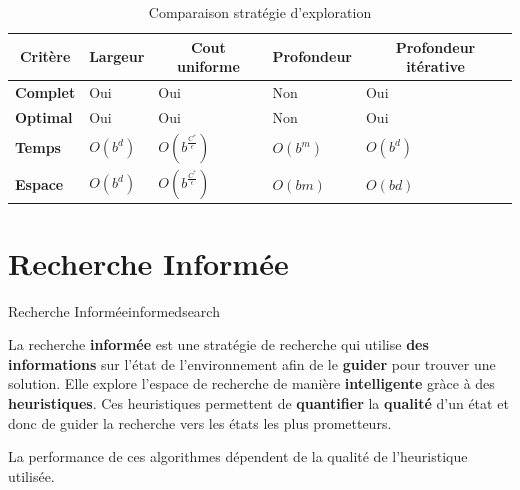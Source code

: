 \documentclass[a4paper, 12pt]{extarticle}
\begin{document}
\begin{table}[H]
    \caption{Comparaison stratégie d'exploration}\label{tab:searchcomp}
    \begin{center}
        \begin{tabular}[c]{|l||l|l|l|l|}
            \hline
            \multicolumn{1}{|c|}{\textbf{Critère}} & 
            \multicolumn{1}{|c|}{\textbf{Largeur}} &
            \multicolumn{1}{c|}{\textbf{Cout uniforme}} &
            \multicolumn{1}{c|}{\textbf{Profondeur}} &
            \multicolumn{1}{c|}{\textbf{Profondeur itérative}} \\

            \hline
            \textbf{Complet}& Oui & Oui & Non & Oui \\ 
            \hline
            \textbf{Optimal}& Oui & Oui & Non & Oui\\ 
            \hline
            \textbf{Temps}& $O(b^d)$ & $O(b^{\frac{C^*}{\epsilon}})$ & $O(b^m)$ & $O(b^d)$\\ 
            \hline
            \textbf{Espace}& $O(b^d)$ & $O(b^{\frac{C^*}{\epsilon}})$ & $O(bm)$ & $O(bd)$\\

            \hline
        \end{tabular}
    \end{center}
\end{table}


\newpage

\section{Recherche Informée} %
\label{sec:recherche_informee} 

\begin{definition}{Recherche Informée}{informedsearch}

    La recherche \textbf{informée} est une stratégie de recherche qui utilise \textbf{des informations} sur l'état de l'environnement afin de le \textbf{guider} pour trouver une solution.
    Elle explore l'espace de recherche de manière \textbf{intelligente} gràce à des \textbf{heuristiques}. 
    Ces heuristiques permettent de \textbf{quantifier} la \textbf{qualité} d'un état et donc 
    de guider la recherche vers les états les plus prometteurs.
\end{definition}

\begin{remark}\leavevmode
    La performance de ces algorithmes dépendent de la qualité de l'heuristique utilisée.
\end{remark}
\end{document}
